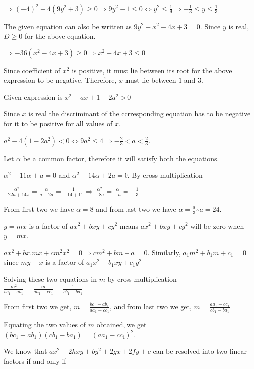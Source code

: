   $\Rightarrow (-4)^2 - 4(9y^2 + 3) \ge 0\Rightarrow 9y^2 - 1 \le 0 \Leftrightarrow y^2 \le
  \frac{1}{9}\Rightarrow -\frac{1}{3} \le y \le \frac{1}{3}$

  The given equation can also be written as $9y^2 + x^2 - 4x + 3 = 0$. Since $y$ is real, $D \ge 0$ for the
  above equation.

  $\Rightarrow -36(x^2 - 4x + 3) \ge 0\Rightarrow x^2 - 4x + 3 \le 0$

  Since coefficient of $x^2$ is positive, it must lie between its root for the above expression to be negative.
  Therefore, $x$ must lie between $1$ and $3$.
\item Given expression is $x^2 - ax + 1 - 2a^2 > 0$

  Since $x$ is real the discriminant of the corresponding equation has to be negative for it to be positive
  for all values of $x$.

  $a^2 - 4(1 - 2a^2) < 0 \Leftrightarrow 9a^2 \le 4\Rightarrow -\frac{2}{3} < a < \frac{2}{3}$.
\item Let $\alpha$ be a common factor, therefore it will satisfy both the equations.

  $\alpha^2 - 11\alpha + a = 0$ and $\alpha^2 - 14\alpha + 2a = 0$. By cross-multiplication

  $\frac{\alpha^2}{-22a + 14x} = \frac{\alpha}{a - 2a} = \frac{1}{-14 + 11}\Rightarrow \frac{\alpha^2}{-8a}
  = \frac{\alpha}{-a} = -\frac{1}{3}$

  From first two we have $\alpha = 8$ and from last two we have $\alpha = \frac{a}{3}\therefore a = 24$.
\item $y = mx$ is a factor of $ax^2 + bxy + cy^2$ means $ax^2 + bxy + cy^2$ will be zero when
  $y = mx$.

  $ax^2 + bx.mx + cm^2x^2 = 0 \Rightarrow cm^2 + bm + a = 0$. Similarly, $a_1m^2 + b_1m + c_1 = 0$ since $my
  - x$ is a factor of $a_1x^2 + b_1xy + c_1y^2$

  Solving these two equations in $m$ by cross-multiplication $\frac{m^2}{bc_1 - ab_1} = \frac{m}{aa_1 -
    cc_1} = \frac{1}{cb_1 - ba_1}$

  From first two we get, $m = \frac{bc_1 - ab_1}{aa_1 - cc_1}$, and from last two we get, $m = \frac{aa_1 -
    cc_1}{cb_1 - ba_1}$

  Equating the two values of $m$ obtained, we get $(bc_1 - ab_1)(cb_1 - ba_1) = (aa_1 - cc_1)^2$.
\item We know that $ax^2 + 2hxy + by^2 + 2gx + 2fy + c$ can be resolved into two linear factors if and only if

